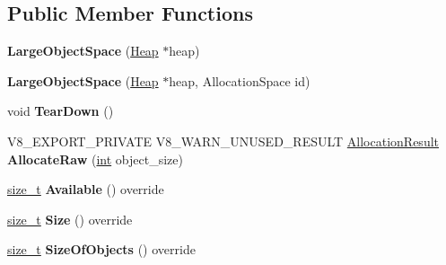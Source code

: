 \subsection*{Public Member Functions}
\begin{DoxyCompactItemize}
\item 
\mbox{\label{classv8_1_1internal_1_1LargeObjectSpace_a2b3d1cec1c22ae30ce0856180b59c4c1}} 
{\bfseries Large\+Object\+Space} (\mbox{\hyperlink{classv8_1_1internal_1_1Heap}{Heap}} $\ast$heap)
\item 
\mbox{\label{classv8_1_1internal_1_1LargeObjectSpace_a66af439bbce805dece4e3db9ee5a3d98}} 
{\bfseries Large\+Object\+Space} (\mbox{\hyperlink{classv8_1_1internal_1_1Heap}{Heap}} $\ast$heap, Allocation\+Space id)
\item 
\mbox{\label{classv8_1_1internal_1_1LargeObjectSpace_a4f1bf837df9444515b16160be0780838}} 
void {\bfseries Tear\+Down} ()
\item 
\mbox{\label{classv8_1_1internal_1_1LargeObjectSpace_a45fea849466c61785c591074d6c3a5be}} 
V8\+\_\+\+E\+X\+P\+O\+R\+T\+\_\+\+P\+R\+I\+V\+A\+TE V8\+\_\+\+W\+A\+R\+N\+\_\+\+U\+N\+U\+S\+E\+D\+\_\+\+R\+E\+S\+U\+LT \mbox{\hyperlink{classv8_1_1internal_1_1AllocationResult}{Allocation\+Result}} {\bfseries Allocate\+Raw} (\mbox{\hyperlink{classint}{int}} object\+\_\+size)
\item 
\mbox{\label{classv8_1_1internal_1_1LargeObjectSpace_a5a3f2f2fec9b1a0eaaa3f6b245682745}} 
\mbox{\hyperlink{classsize__t}{size\+\_\+t}} {\bfseries Available} () override
\item 
\mbox{\label{classv8_1_1internal_1_1LargeObjectSpace_a2023a8f3862de2031589df610efde1cd}} 
\mbox{\hyperlink{classsize__t}{size\+\_\+t}} {\bfseries Size} () override
\item 
\mbox{\label{classv8_1_1internal_1_1LargeObjectSpace_a725fbc2f6b0ab3e0bc612daf00d81fc0}} 
\mbox{\hyperlink{classsize__t}{size\+\_\+t}} {\bfseries Size\+Of\+Objects} () override

\end{DoxyCompactItemize}
